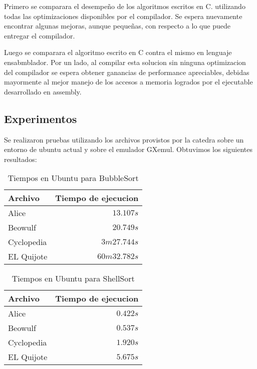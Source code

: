 \documentclass[a4paper,11pt]{article}
\begin{document}
Primero se comparara el desempeño de los algoritmos escritos en C. utilizando todas las optimizaciones disponibles por el
compilador. Se espera nuevamente encontrar algunas mejoras, aunque pequeñas,
con respecto a lo que puede entregar el compilador.

Luego se comparara el algoritmo escrito en C contra el mismo en lenguaje ensabmblador.
Por un lado, al compilar esta solucion sin ninguna optimizacion del compilador 
se espera obtener ganancias de performance apreciables, debidas mayormente al 
mejor manejo de los accesos a memoria logrados por el ejecutable desarrollado en assembly.

\subsection{Experimentos}

Se realizaron pruebas utilizando los archivos provistos por la catedra sobre un entorno de ubuntu actual y sobre el emulador GXemul.
Obtuvimos los siguientes resultados:

\begin{table}[h!t]
\centering
\begin{tabular}{ | l | r | }
  \hline
  Archivo          & Tiempo de ejecucion \\ \hline
  Alice				 & \(13.107s\) \\
  Beowulf     & \(20.749s\) \\
  Cyclopedia     & \(3m 27.744s\) \\
  EL Quijote      & \(60m 32.782s\) \\
  \hline
\end{tabular}
\caption{Tiempos en Ubuntu para BubbleSort}
\label{tab:resultados}
\end{table}

\FloatBarrier

\begin{table}[h!t]
\centering
\begin{tabular}{ | l | r | }
  \hline
  Archivo          & Tiempo de ejecucion \\ \hline
  Alice				 & \(0.422s\) \\
  Beowulf     & \(0.537s\) \\
  Cyclopedia     & \(1.920s\) \\
  EL Quijote      & \(5.675s\) \\
  \hline
\end{tabular}
\caption{Tiempos en Ubuntu para ShellSort}
\label{tab:resultados}
\end{table}
\end{document}
